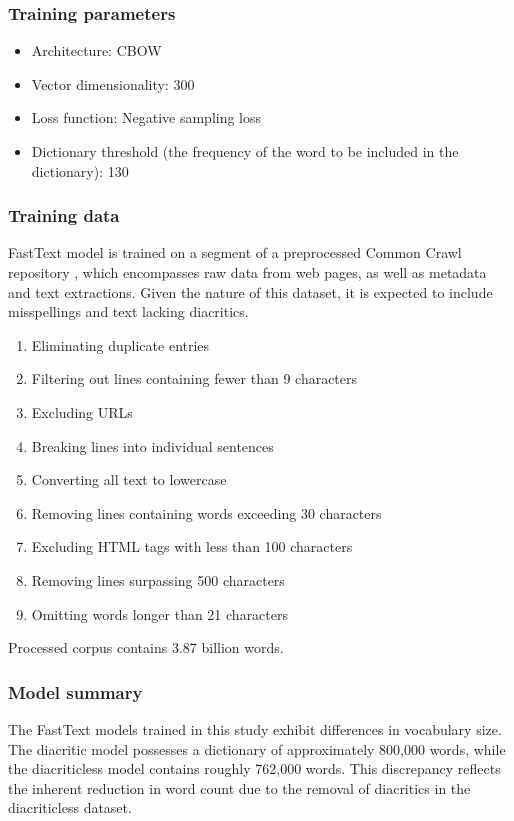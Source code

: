 \subsubsection{Training parameters}
\begin{itemize}
  \item Architecture: \ac{CBOW} 
  \item Vector dimensionality: 300
  \item Loss function: Negative sampling loss
  \item Dictionary threshold (the frequency of the word to be included in the dictionary): 130
\end{itemize}

\subsubsection{Training data}

FastText model is trained on a segment of a preprocessed Common Crawl repository \cite{commoncrawl}, which encompasses raw data from web pages, as well as metadata and text extractions.
Given the nature of this dataset, it is expected to include misspellings and text lacking diacritics.

\begin{enumerate}
  \item Eliminating duplicate entries
  \item Filtering out lines containing fewer than 9 characters
  \item Excluding URLs
  \item Breaking lines into individual sentences
  \item Converting all text to lowercase
  \item Removing lines containing words exceeding 30 characters
  \item Excluding HTML tags with less than 100 characters
  \item Removing lines surpassing 500 characters
  \item Omitting words longer than 21 characters
\end{enumerate}

Processed corpus contains 3.87 billion words.

\subsubsection{Model summary}

The FastText models trained in this study exhibit differences in vocabulary size.
The diacritic model possesses a dictionary of approximately 800,000 words, while the diacriticless model contains roughly 762,000 words.
This discrepancy reflects the inherent reduction in word count due to the removal of diacritics in the diacriticless dataset.

